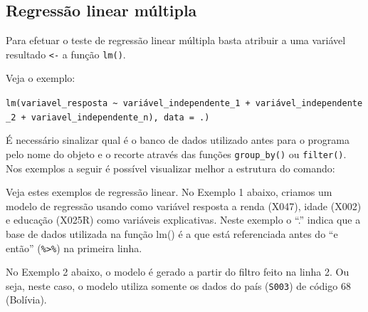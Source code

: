 \documentclass[
  10pt,
  brazil,
  a4paper,
  twoside, notitlepage, openright]{book}
\newenvironment{Shaded}{\begin{snugshade}}{\end{snugshade}}
\newcommand{\CommentTok}[1]{\textcolor[rgb]{0.56,0.35,0.01}{\textit{#1}}}
\newcommand{\DataTypeTok}[1]{\textcolor[rgb]{0.13,0.29,0.53}{#1}}
\newcommand{\DecValTok}[1]{\textcolor[rgb]{0.00,0.00,0.81}{#1}}
\newcommand{\KeywordTok}[1]{\textcolor[rgb]{0.13,0.29,0.53}{\textbf{#1}}}
\newcommand{\NormalTok}[1]{#1}
\newcommand{\OperatorTok}[1]{\textcolor[rgb]{0.81,0.36,0.00}{\textbf{#1}}}
\newcommand{\StringTok}[1]{\textcolor[rgb]{0.31,0.60,0.02}{#1}}
\begin{document}
\hypertarget{regressuxe3o-linear-muxfaltipla}{%
\subsection{Regressão linear múltipla}\label{regressuxe3o-linear-muxfaltipla}}

Para efetuar o teste de regressão linear múltipla basta atribuir a uma variável resultado \texttt{\textless{}-} a função \texttt{lm()}.

Veja o exemplo:

\texttt{lm(variavel\_resposta\ \textasciitilde{}\ variável\_independente\_1\ +\ variável\_independente\_2\ +\ variavel\_independente\_n),\ data\ =\ .)}

É necessário sinalizar qual é o banco de dados utilizado antes para o programa pelo nome do objeto e o recorte através das funções \texttt{group\_by()} ou \texttt{filter()}. Nos exemplos a seguir é possível visualizar melhor a estrutura do comando:

Veja estes exemplos de regressão linear. No Exemplo 1 abaixo, criamos um modelo de regressão usando como variável resposta a renda (X047), idade (X002) e educação (X025R) como variáveis explicativas. Neste exemplo o ``.'' indica que a base de dados utilizada na função lm() é a que está referenciada antes do ``e então'' (\texttt{\%\textgreater{}\%}) na primeira linha.

\begin{Shaded}
\end{Shaded}

No Exemplo 2 abaixo, o modelo é gerado a partir do filtro feito na linha 2. Ou seja, neste caso, o modelo utiliza somente os dados do país (\texttt{S003}) de código 68 (Bolívia).

\begin{Shaded}
\end{Shaded}
\end{document}
